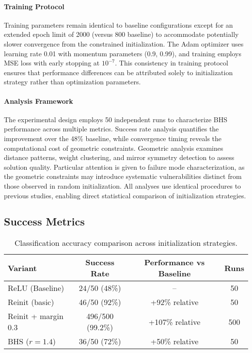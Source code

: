\paragraph{Training Protocol}
Training parameters remain identical to baseline configurations except for an extended epoch limit of 2000 (versus 800 baseline) to accommodate potentially slower convergence from the constrained initialization. The Adam optimizer uses learning rate 0.01 with momentum parameters (0.9, 0.99), and training employs MSE loss with early stopping at $10^{-7}$. This consistency in training protocol ensures that performance differences can be attributed solely to initialization strategy rather than optimization parameters.

\paragraph{Analysis Framework}
The experimental design employs 50 independent runs to characterize BHS performance across multiple metrics. Success rate analysis quantifies the improvement over the 48\% baseline, while convergence timing reveals the computational cost of geometric constraints. Geometric analysis examines distance patterns, weight clustering, and mirror symmetry detection to assess solution quality. Particular attention is given to failure mode characterization, as the geometric constraints may introduce systematic vulnerabilities distinct from those observed in random initialization. All analyses use identical procedures to previous studies, enabling direct statistical comparison of initialization strategies.


\subsection*{Success Metrics}

\begin{table}[ht]
\centering
\caption{Classification accuracy comparison across initialization strategies.}
\label{tab:relu1-bhs-success}
\begin{tabular}{lccc}
\toprule
Variant & Success Rate & Performance vs Baseline & Runs \\
\midrule
ReLU (Baseline) & 24/50 (48\%) & -- & 50 \\
Reinit (basic) & 46/50 (92\%) & +92\% relative & 50 \\
Reinit + margin 0.3 & 496/500 (99.2\%) & +107\% relative & 500 \\
BHS ($r=1.4$) & 36/50 (72\%) & +50\% relative & 50 \\
\bottomrule
\end{tabular}
\end{table}

